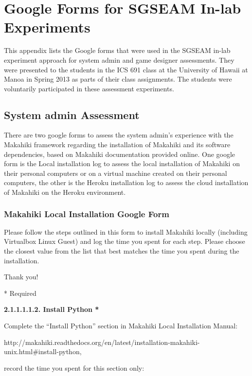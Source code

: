 \chapter{Google Forms for SGSEAM In-lab Experiments}
\label{app:googleform}

This appendix lists the Google forms that were used in the SGSEAM in-lab experiment approach for system admin and game designer assessments. They were presented to the students in the ICS 691 class at the University of Hawaii at Manoa in Spring 2013 as parts of their class assignments. The students were voluntarily participated in these assessment experiments.

\section{System admin Assessment}
\label{app:googleform-sysadmin}

There are two google forms to assess the system admin's experience with the Makahiki framework regarding the installation of Makahiki and its software dependencies, based on Makahiki documentation provided online. One google form is the Local installation log to assess the local installation of Makahiki on their personal computers or on a virtual machine created on their personal computers, the other is the Heroku installation log to assess the cloud installation of Makahiki on the Heroku environment.

\subsection{Makahiki Local Installation Google Form}

\setlength{\parindent}{0pt}
\setlength{\parskip}{3mm}

Please follow the steps outlined in this form to install Makahiki locally (including Virtualbox Linux Guest) and log the time you spent for each step.
Please choose the closest value from the list that best matches the time you spent during the installation.

Thank you!

* Required

{\bf 2.1.1.1.1.2. Install Python *}

Complete the ``Install Python'' section in Makahiki Local Installation Manual:

http://makahiki.readthedocs.org/en/latest/installation-makahiki-unix.html\#install-python,

record the time you spent for this section only:

